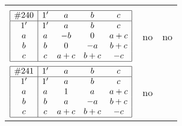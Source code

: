 \documentclass[12pt]{article}
\newcommand{\join}{\mathbin{+}}%
\newcommand{\id}{{1'}}%
\renewcommand{\top}{1}%
\begin{document}
\begin{center}
\begin{longtable}{l|c|c}
{\begin{tikzpicture}[<->,shorten <=1pt,shorten >=1pt,label distance=0mm, font=\small]
\end{tikzpicture}
}      \\[15mm]

$
\begin{array}{|c|cccc|} \hline
\#240 & \id & a & b & c \\ \hline
\id & \id & a & b & c \\
a & a & -b & 0 & a \join c \\
b & b & 0 & -a & b \join c \\
c & c & a \join c & b \join c & -c \\ \hline
\end{array}
$
 & no  
 & no      \\[15mm]

$
\begin{array}{|c|cccc|} \hline
\#241 & \id & a & b & c \\ \hline
\id & \id & a & b & c \\
a & a & \top & a & a \join c \\
b & b & a & -a & b \join c \\
c & c & a \join c & b \join c & -c \\ \hline
\end{array}
$
 & no  
 & \adjustbox{valign=c, max height=1.6cm}{$
\left[ \begin{array}{ccccccc}
\id & a & a & b & c & a & b \\ 
a & \id & a & a & a & c & a \\ 
a & a & \id & a & a & c & a \\ 
b & a & a & \id & b & a & b \\ 
c & a & a & b & \id & a & c \\ 
a & c & c & a & a & \id & a \\ 
b & a & a & b & c & a & \id
\end{array}\right]
$}      \\[15mm]


\end{longtable}
\end{center}
\end{document}
